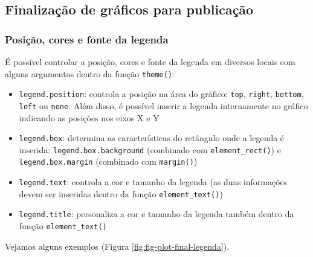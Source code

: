 \documentclass[
]{article}
\begin{document}
\hypertarget{finalizauxe7uxe3o-de-gruxe1ficos-para-publicauxe7uxe3o}{%
\subsection{Finalização de gráficos para publicação}\label{finalizauxe7uxe3o-de-gruxe1ficos-para-publicauxe7uxe3o}}

\hypertarget{posiuxe7uxe3o-cores-e-fonte-da-legenda}{%
\subsubsection{Posição, cores e fonte da legenda}\label{posiuxe7uxe3o-cores-e-fonte-da-legenda}}

É possível controlar a posição, cores e fonte da legenda em diversos locais com alguns argumentos dentro da função \texttt{theme()}:

\begin{itemize}
\item
  \texttt{legend.position}: controla a posição na área do gráfico: \texttt{top}, \texttt{right}, \texttt{bottom}, \texttt{left} ou \texttt{none}. Além disso, é possível inserir a legenda internamente no gráfico indicando as posições nos eixos X e Y
\item
  \texttt{legend.box}: determina as características do retângulo onde a legenda é inserida: \texttt{legend.box.background} (combinado com \texttt{element\_rect()}) e \texttt{legend.box.margin} (combinado com \texttt{margin()})
\item
  \texttt{legend.text}: controla a cor e tamanho da legenda (as duas informações devem ser inseridas dentro da função \texttt{element\_text()})
\item
  \texttt{legend.title}: personaliza a cor e tamanho da legenda também dentro da função \texttt{element\_text()}
\end{itemize}

Vejamos alguns exemplos (Figura \ref{fig:fig-plot-final-legenda}).
\end{document}
